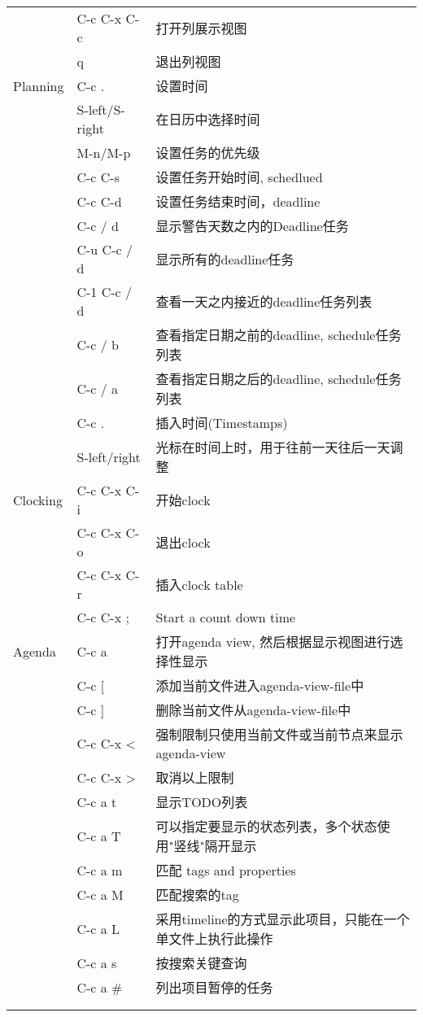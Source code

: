 \documentclass[10pt,a4paper]{article}
\begin{document}
\begin{center}
\begin{tabular}{lll}
 & C-c C-x C-c & 打开列展示视图\\
 & q & 退出列视图\\
\hline
Planning & C-c . & 设置时间\\
 & S-left/S-right & 在日历中选择时间\\
 & M-n/M-p & 设置任务的优先级\\
 & C-c C-s & 设置任务开始时间, schedlued\\
 & C-c C-d & 设置任务结束时间，deadline\\
 & C-c / d & 显示警告天数之内的Deadline任务\\
 & C-u C-c / d & 显示所有的deadline任务\\
 & C-1 C-c / d & 查看一天之内接近的deadline任务列表\\
 & C-c / b & 查看指定日期之前的deadline, schedule任务列表\\
 & C-c / a & 查看指定日期之后的deadline, schedule任务列表\\
 & C-c . & 插入时间(Timestamps)\\
 & S-left/right & 光标在时间上时，用于往前一天往后一天调整\\
\hline
Clocking & C-c C-x C-i & 开始clock\\
 & C-c C-x C-o & 退出clock\\
 & C-c C-x C-r & 插入clock table\\
 & C-c C-x ; & Start a count down time\\
\hline
Agenda & C-c a & 打开agenda view, 然后根据显示视图进行选择性显示\\
 & C-c [ & 添加当前文件进入agenda-view-file中\\
 & C-c ] & 删除当前文件从agenda-view-file中\\
 & C-c C-x < & 强制限制只使用当前文件或当前节点来显示agenda-view\\
 & C-c C-x > & 取消以上限制\\
 & C-c a t & 显示TODO列表\\
 & C-c a T & 可以指定要显示的状态列表，多个状态使用"竖线"隔开显示\\
 & C-c a m & 匹配 tags and properties\\
 & C-c a M & 匹配搜索的tag\\
 & C-c a L & 采用timeline的方式显示此项目，只能在一个单文件上执行此操作\\
 & C-c a s & 按搜索关键查询\\
 & C-c a \# & 列出项目暂停的任务\\
 &  & \\
 &  & \\

\end{tabular}
\end{center}
\end{document}
